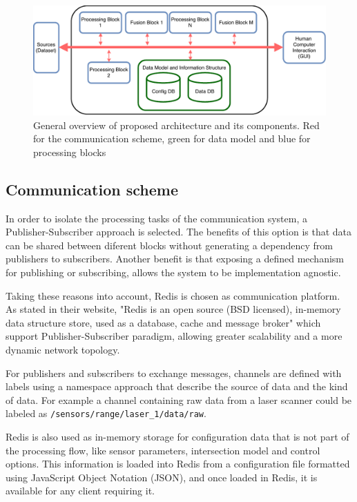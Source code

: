 \begin{figure}[ht!]
\centering
\includegraphics[scale=0.7]{fig/3/proposal_blocks.pdf}
\caption{General overview of proposed architecture and its components. Red for the communication scheme, green for data model and blue for processing blocks}
\label{proposal_blocks}
\end{figure} 



\subsection{Communication scheme}

In order to isolate the processing tasks of the communication system, a Publisher-Subscriber approach is selected. The benefits of this option is that data can be shared between diferent blocks without generating a dependency from publishers to subscribers. Another benefit is that exposing a defined mechanism for publishing or subscribing, allows the system to be implementation agnostic.

Taking these reasons into account, Redis is chosen as communication platform. As stated in their website, "Redis is an open source (BSD licensed), in-memory data structure store, used as a database, cache and message broker"\cite{Redis} which support Publisher-Subscriber paradigm, allowing greater scalability and a more dynamic network topology.

For publishers and subscribers to exchange messages, channels are defined with labels using a namespace approach that describe the source of data and the kind of data. For example a channel containing raw data from a laser scanner could be labeled as \texttt{/sensors/range/laser\_1/data/raw}.

Redis is also used as in-memory storage for configuration data that is not part of the processing flow, like sensor parameters, intersection model and control options. This information is loaded into Redis from a configuration file formatted using JavaScript Object Notation (JSON), and once loaded in Redis, it is available for any client requiring it.

